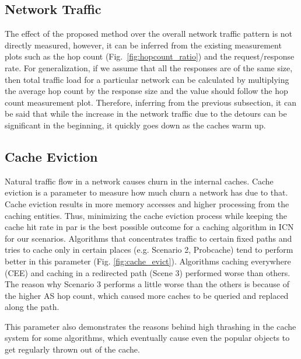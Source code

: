 \documentclass[article]{elsarticle}
\begin{document}
\subsection{Network Traffic}
The effect of the proposed method over the overall network traffic pattern is not directly measured, however, it can be inferred from the existing measurement plots such as the hop count (Fig.~\ref{fig:hopcount_ratio}) and the request/response rate. For generalization, if we assume that all the responses are of the same size, then total traffic load for a particular network can be calculated by multiplying the average hop count by the response size and the value should follow the hop count measurement plot. Therefore, inferring from the previous subsection, it can be said that while the increase in the network traffic due to the detours can be significant in the beginning, it quickly goes down as the caches warm up. 


\subsection{Cache Eviction}
Natural traffic flow in a network causes churn in the internal caches. Cache eviction is a parameter to measure how much churn a network has due to that. Cache eviction results in more memory accesses and higher processing from the caching entities. Thus, minimizing the cache eviction process while keeping the cache hit rate in par is the best possible outcome for a caching algorithm in ICN for our scenarios. Algorithms that concentrates traffic to certain fixed paths and tries to cache only in certain places (e.g. Scenario 2, Probcache) tend to perform better in this parameter (Fig. \ref{fig:cache_evict}). Algorithms caching everywhere (CEE) and caching in a redirected path (Scene 3) performed worse than others. The reason why Scenario 3 performs a little worse than the others is because of the higher AS hop count, which caused more caches to be queried and replaced along the path.

This parameter also demonstrates the reasons behind high thrashing in the cache system for some algorithms, which eventually cause even the popular objects to get regularly thrown out of the cache. 
\end{document}
